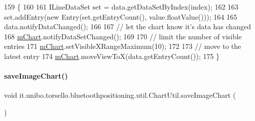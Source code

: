 \begin{DoxyCode}
159                                                                    \{
160 
161         ILineDataSet \textcolor{keyword}{set} = data.getDataSetByIndex(index);
162 
163         \textcolor{keyword}{set}.addEntry(\textcolor{keyword}{new} Entry(\textcolor{keyword}{set}.getEntryCount(), value.floatValue()));
164 
165         data.notifyDataChanged();
166 
167         \textcolor{comment}{// let the chart know it's data has changed}
168         \hyperlink{classit_1_1unibo_1_1torsello_1_1bluetoothpositioning_1_1util_1_1ChartUtil_a60b5bd6796cc5dcde12d9a6bb3e67c86_a60b5bd6796cc5dcde12d9a6bb3e67c86}{mChart}.notifyDataSetChanged();
169 
170         \textcolor{comment}{// limit the number of visible entries}
171         \hyperlink{classit_1_1unibo_1_1torsello_1_1bluetoothpositioning_1_1util_1_1ChartUtil_a60b5bd6796cc5dcde12d9a6bb3e67c86_a60b5bd6796cc5dcde12d9a6bb3e67c86}{mChart}.setVisibleXRangeMaximum(10);
172 
173         \textcolor{comment}{// move to the latest entry}
174         \hyperlink{classit_1_1unibo_1_1torsello_1_1bluetoothpositioning_1_1util_1_1ChartUtil_a60b5bd6796cc5dcde12d9a6bb3e67c86_a60b5bd6796cc5dcde12d9a6bb3e67c86}{mChart}.moveViewToX(data.getEntryCount());
175     \}
\end{DoxyCode}
\hypertarget{classit_1_1unibo_1_1torsello_1_1bluetoothpositioning_1_1util_1_1ChartUtil_a246a056ad6773a4b2d041e693570d02c_a246a056ad6773a4b2d041e693570d02c}{}\label{classit_1_1unibo_1_1torsello_1_1bluetoothpositioning_1_1util_1_1ChartUtil_a246a056ad6773a4b2d041e693570d02c_a246a056ad6773a4b2d041e693570d02c} 
\paragraph{\texorpdfstring{save\+Image\+Chart()}{saveImageChart()}}
{\footnotesize\ttfamily void it.\+unibo.\+torsello.\+bluetoothpositioning.\+util.\+Chart\+Util.\+save\+Image\+Chart (\begin{DoxyParamCaption}{ }\end{DoxyParamCaption})}


